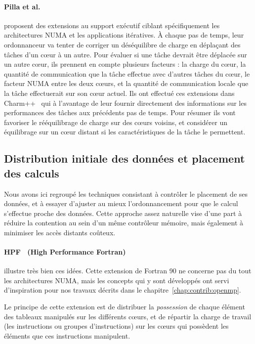 \paragraph{Pilla et al.~\cite{Pilla2014}} proposent des extensions au support exécutif ciblant spécifiquement les architectures NUMA et les applications itératives.
À chaque pas de temps, leur ordonnanceur va tenter de corriger un déséquilibre de charge en déplaçant des tâches d'un cœur à un autre.
Pour évaluer si une tâche devrait être déplacée sur un autre cœur, ils prennent en compte plusieurs facteurs : la charge du cœur, la quantité de communication que la tâche effectue avec d'autres tâches du cœur, le facteur NUMA entre les deux cœurs, et la quantité de communication locale que la tâche effectuerait sur son cœur actuel.
Ils ont effectué ces extensions dans Charm++~\cite{Kale1993} qui à l'avantage de leur fournir directement des informations sur les performances des tâches aux précédents pas de temps.
Pour résumer ils vont favoriser le rééquilibrage de charge sur des cœurs voisins, et considérer un équilibrage sur un cœur distant si les caractéristiques de la tâche le permettent.


\subsection{Distribution initiale des données et placement des calculs}

Nous avons ici regroupé les techniques consistant à contrôler le placement de ses données, et à essayer d'ajuster au mieux l'ordonnancement pour que le calcul s'effectue proche des données.
Cette approche assez naturelle vise d'une part à réduire la contention au sein d'un même contrôleur mémoire, mais également à minimiser les accès distants coûteux.

\paragraph{HPF~\cite{HPF} (High Performance Fortran)} illustre très bien ces idées.
Cette extension de Fortran 90 ne concerne pas du tout les architectures NUMA, mais les concepts qui y sont développés ont servi d'inspiration pour nos travaux décrits dans le chapitre~\ref{chap:contrib:openmp}.

Le principe de cette extension est de distribuer la \emph{possession} de chaque élément des tableaux manipulés sur les différents cœurs, et de répartir la charge de travail (les instructions ou groupes d'instructions) sur les cœurs qui possèdent les éléments que ces instructions manipulent.

